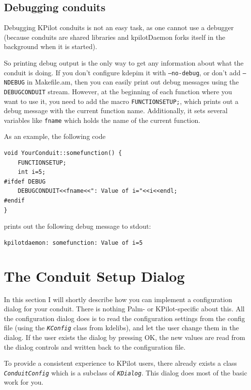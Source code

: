 \documentclass[10pt,a4paper]{article}
\newcommand{\code}[1]{{\small\texttt{#1}}}
\newcommand{\class}[1]{{\small\em\texttt{#1}}}
\begin{document}
\subsection{Debugging conduits}

Debugging KPilot conduits is not an easy task, as one cannot use a debugger 
(because conduits are shared libraries and kpilotDaemon forks itself 
in the background when it is started).

So printing debug output is the only way to get any information about what 
the conduit is doing. If you don't configure kdepim it with \code{--no-debug}, or don't add 
\code{--NDEBUG} in Makefile.am, then you can easily print out debug messages
using the \code{DEBUGCONDUIT} stream. However, at the beginning of each 
function where you want to use it, you need to add the macro \code{FUNCTIONSETUP;}, 
which prints out a debug message with the current function name. Additionally, 
it sets several variables like \code{fname} which holds the name of the current function.

 As an example, the following code
{\footnotesize\begin{verbatim}
void YourConduit::somefunction() {
    FUNCTIONSETUP;
    int i=5;
#ifdef DEBUG
    DEBUGCONDUIT<<fname<<": Value of i="<<i<<endl;
#endif
}
\end{verbatim}
}
prints out the following debug message to stdout:
{\small\begin{verbatim}
kpilotdaemon: somefunction: Value of i=5
\end{verbatim}
}



\section{The Conduit Setup Dialog}\label{SetupSection}

In this section I will shortly describe how you can implement a configuration dialog for your conduit. 
There is nothing Palm- or KPilot-specific about this. All the configuration dialog does is to read the 
configuration settings from the config file (using the \class{KConfig} class from kdelibs), and let 
the user change them in the dialog. If the user exists the dialog by pressing OK, the new values are 
read from the dialog controls and written back to the configuration file.

To provide a consistent experience to KPilot users, there already 
exists a class \class{ConduitConfig} which is a subclass of \class{KDialog}. 
This dialog does most of the basic work for you.
\end{document}
